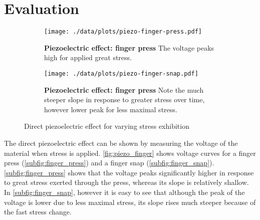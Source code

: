\section{Evaluation}
\begin{figure}[tbp]
	\centering
	\begin{subfigure}{0.4\textwidth}
		\centering
		\texttt{[image: ./data/plots/piezo-finger-press.pdf]}
		\caption[Piezoelectric effect: finger press]{\textbf{Piezoelectric effect: finger press} The voltage peaks high for applied great stress.}
		\label{subfig:finger_press}
	\end{subfigure}\quad
	\begin{subfigure}{0.4\textwidth}
		\centering
		\texttt{[image: ./data/plots/piezo-finger-snap.pdf]}
		\caption[Piezoelectric effect: finger snap]{\textbf{Piezoelectric effect: finger press} Note the much steeper slope in response to greater stress over time, however lower peak for less maximal stress.}
		\label{subfig:finger_snap}
	\end{subfigure}
	\caption{Direct piezoelectric effect for varying stress exhibition}
	\label{fig:piezo_finger}
\end{figure}
The direct piezoelectric effect can be shown by measuring the voltage of the material when stress is applied.
\autoref{fig:piezo_finger} shows voltage curves for a finger press (\autoref{subfig:finger_press}) and a finger snap (\autoref{subfig:finger_snap}).
\autoref{subfig:finger_press} shows that the voltage peaks significantly higher in response to great stress exerted through the press, whereas its slope is relatively shallow.
In \autoref{subfig:finger_snap}, however it is easy to see that although the peak of the voltage is lower due to less maximal stress, its slope rises much steeper because of the fast stress change.

